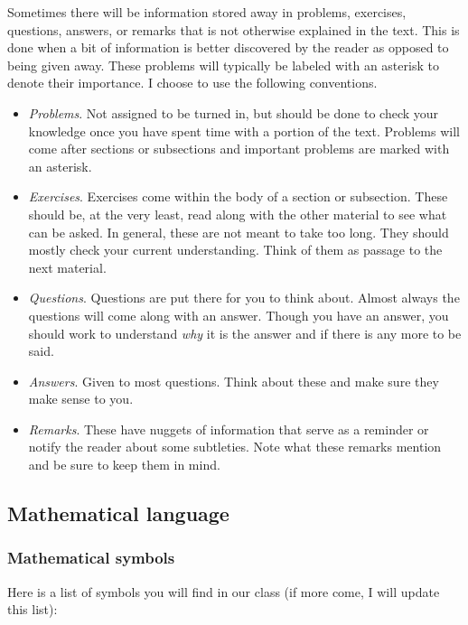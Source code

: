     Sometimes there will be information stored away in problems, exercises, questions, answers, or remarks that is not otherwise explained in the text.  This is done when a bit of information is better discovered by the reader as opposed to being given away.  These problems will typically be labeled with an asterisk to denote their importance. I choose to use the following conventions.
    \begin{itemize}
        \item \emph{Problems}. Not assigned to be turned in, but should be done to check your knowledge once you have spent time with a portion of the text.  Problems will come after sections or subsections and important problems are marked with an asterisk.
        \item \emph{Exercises}. Exercises come within the body of a section or subsection. These should be, at the very least, read along with the other material to see what can be asked. In general, these are not meant to take too long. They should mostly check your current understanding. Think of them as passage to the next material.
        \item \emph{Questions}. Questions are put there for you to think about.  Almost always the questions will come along with an answer. Though you have an answer, you should work to understand \emph{why} it is the answer and if there is any more to be said.
        \item \emph{Answers}. Given to most questions. Think about these and make sure they make sense to you.
        \item \emph{Remarks}. These have nuggets of information that serve as a reminder or notify the reader about some subtleties. Note what these remarks mention and be sure to keep them in mind.
    \end{itemize}

    \subsection{Mathematical language}

    \subsubsection{Mathematical symbols}

    Here is a list of symbols you will find in our class (if more come, I will update this list):

